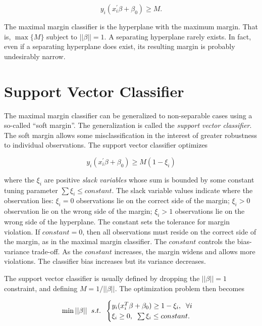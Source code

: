 \documentclass[
]{book}
\begin{document}
\[y_i (x_i^{'} \beta + \beta_0) \ge M.\]

The maximal margin classifier is the hyperplane with the maximum margin. That is, \(\max \{M\}\) subject to \(||\beta|| = 1\). A separating hyperplane rarely exists. In fact, even if a separating hyperplane does exist, its resulting margin is probably undesirably narrow.

\hypertarget{support-vector-classifier}{%
\section{Support Vector Classifier}\label{support-vector-classifier}}

The maximal margin classifier can be generalized to non-separable cases using a so-called ``soft margin''. The generalization is called the \emph{support vector classifier}. The soft margin allows some misclassification in the interest of greater robustness to individual observations. The support vector classifier optimizes

\[y_i (x_i^{'} \beta + \beta_0) \ge M(1 - \xi_i)\]

where the \(\xi_i\) are positive \emph{slack variables} whose sum is bounded by some constant tuning parameter \(\sum{\xi_i} \le constant\). The slack variable values indicate where the observation lies: \(\xi_i = 0\) observations lie on the correct side of the margin; \(\xi_i > 0\) observation lie on the wrong side of the margin; \(\xi_i > 1\) observations lie on the wrong side of the hyperplane. The constant sets the tolerance for margin violation. If \(constant = 0\), then all observations must reside on the correct side of the margin, as in the maximal margin classifier. The \(constant\) controls the bias-variance trade-off. As the \(constant\) increases, the margin widens and allows more violations. The classifier bias increases but its variance decreases.

The support vector classifier is usually defined by dropping the \(||\beta|| = 1\) constraint, and defining \(M = 1 / ||\beta||\). The optimization problem then becomes

\[
 \min ||\beta|| \hspace{2mm} s.t. \hspace{2mm}  
  \begin{cases} 
   y_i(x_i^T\beta + \beta_0) \ge 1 - \xi_i, \hspace{2mm} \forall i &  \\
   \xi_i \ge 0, \hspace{2mm} \sum \xi_i \le constant.      
  \end{cases}
\]
\end{document}
